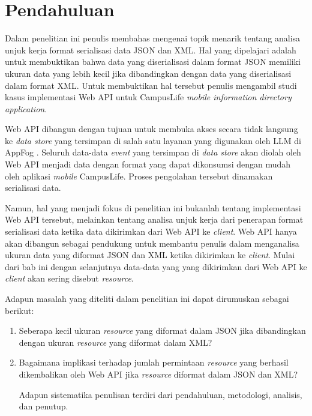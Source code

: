 \documentclass{llncs}
\begin{document}
\section{Pendahuluan}

\onehalfspacing Dalam penelitian ini penulis membahas mengenai topik menarik tentang analisa unjuk kerja format serialisasi data JSON dan XML. Hal yang dipelajari adalah untuk membuktikan bahwa data yang diserialisasi dalam format JSON memiliki ukuran data yang lebih kecil jika dibandingkan dengan data yang diserialisasi dalam format XML. Untuk membuktikan hal tersebut penulis mengambil studi kasus implementasi Web API untuk CampusLife \textit{mobile information directory application}.

Web API dibangun dengan tujuan untuk membuka akses secara tidak langsung ke \textit{data store} yang tersimpan di salah satu layanan yang digunakan oleh LLM di AppFog \cite{db-as-a-service}\cite{data-store}. Seluruh data-data \textit{event} yang tersimpan di \textit{data store} akan diolah oleh Web API menjadi data dengan format yang dapat dikonsumsi dengan mudah oleh aplikasi \textit{mobile} CampusLife. Proses pengolahan tersebut dinamakan serialisasi data.

\onehalfspacing Namun, hal yang menjadi fokus di penelitian ini bukanlah tentang implementasi Web API tersebut, melainkan tentang analisa unjuk kerja dari penerapan format serialisasi data ketika data dikirimkan dari Web API ke \textit{client}. Web API hanya akan dibangun sebagai pendukung untuk membantu penulis dalam menganalisa ukuran data yang diformat JSON dan XML ketika dikirimkan ke \textit{client}. Mulai dari bab ini dengan selanjutnya data-data yang yang dikirimkan dari Web API ke \textit{client} akan sering disebut \textit{resource}. 

\onehalfspacing Adapun masalah yang diteliti dalam penelitian ini dapat dirumuskan sebagai berikut:
\begin{enumerate}
  \item Seberapa kecil ukuran \textit{resource} yang diformat dalam JSON jika dibandingkan dengan ukuran \textit{resource} yang diformat dalam XML? 
  \item Bagaimana implikasi terhadap jumlah permintaan  \textit{resource} yang berhasil dikembalikan oleh Web API jika \textit{resource} diformat dalam JSON dan XML?

\onehalfspacing Adapun sistematika penulisan terdiri dari pendahuluan, metodologi, analisis, dan penutup.
\end{enumerate}
\end{document}
